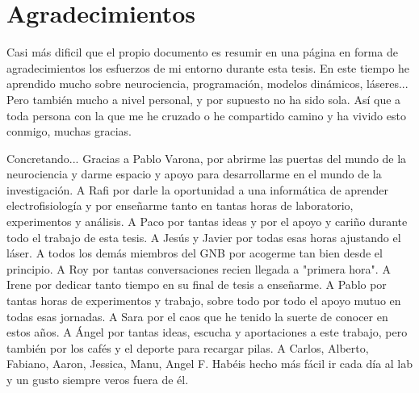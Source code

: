\chapter*{Agradecimientos}
Casi más dificil que el propio documento es resumir en una página en forma de agradecimientos los esfuerzos de mi entorno durante esta tesis. En este tiempo he aprendido mucho sobre neurociencia, programación, modelos dinámicos, láseres... Pero también mucho a nivel personal, y por supuesto no ha sido sola. Así que a toda persona con la que me he cruzado o he compartido camino y ha vivido esto conmigo, muchas gracias. 

Concretando... Gracias a Pablo Varona, por abrirme las puertas del mundo de la neurociencia y darme espacio y apoyo para desarrollarme en el mundo de la investigación. A Rafi por darle la oportunidad a una informática de aprender electrofisiología y por enseñarme tanto en tantas horas de laboratorio, experimentos y análisis. A Paco por tantas ideas y por el apoyo y cariño durante todo el trabajo de esta tesis. A Jesús y Javier por todas esas horas ajustando el láser. A todos los demás miembros del GNB por acogerme tan bien desde el principio. A Roy por tantas conversaciones recien llegada a "primera hora". A Irene por dedicar tanto tiempo en su final de tesis a enseñarme. A Pablo por tantas horas de experimentos y trabajo, sobre todo por todo el apoyo mutuo en todas esas jornadas. A Sara por el caos que he tenido la suerte de conocer en estos años. A Ángel por tantas ideas, escucha y aportaciones a este trabajo, pero también por los cafés y el deporte para recargar pilas. A Carlos, Alberto, Fabiano, Aaron, Jessica, Manu, Angel F. Habéis hecho más fácil ir cada día al lab y un gusto siempre veros fuera de él. 


